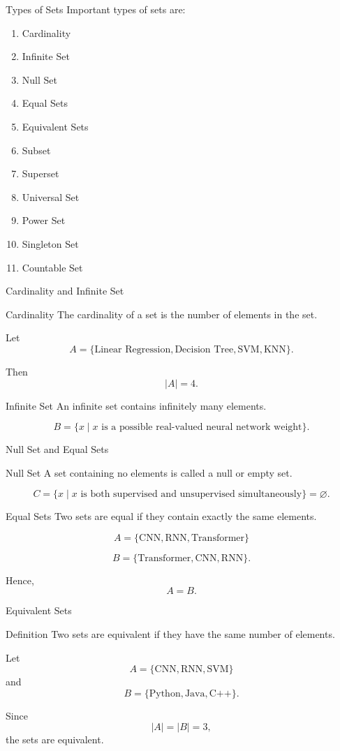 \documentclass[aspectratio=169]{beamer}
\begin{document}
\begin{frame}{Types of Sets}
Important types of sets are:

\begin{enumerate}
\item Cardinality
\item Infinite Set
\item Null Set
\item Equal Sets
\item Equivalent Sets
\item Subset
\item Superset
\item Universal Set
\item Power Set
\item Singleton Set
\item Countable Set
\end{enumerate}
\end{frame}

\begin{frame}{Cardinality and Infinite Set}
\begin{block}{Cardinality}
The cardinality of a set is the number of elements in the set.
\end{block}

Let
\[
A=\{\text{Linear Regression},\text{Decision Tree},\text{SVM},\text{KNN}\}.
\]

Then
\[
|A|=4.
\]

\begin{block}{Infinite Set}
An infinite set contains infinitely many elements.
\end{block}

\[
B=\{x\mid x\text{ is a possible real-valued neural network weight}\}.
\]
\end{frame}

\begin{frame}{Null Set and Equal Sets}
\begin{block}{Null Set}
A set containing no elements is called a null or empty set.
\end{block}

\[
C=\{x\mid x\text{ is both supervised and unsupervised simultaneously}\}
=\varnothing.
\]

\begin{block}{Equal Sets}
Two sets are equal if they contain exactly the same elements.
\end{block}

\[
A=\{\text{CNN},\text{RNN},\text{Transformer}\}
\]

\[
B=\{\text{Transformer},\text{CNN},\text{RNN}\}.
\]

Hence,
\[
A=B.
\]
\end{frame}
\begin{frame}{Equivalent Sets}
\begin{block}{Definition}
Two sets are equivalent if they have the same number of elements.
\end{block}

Let
\[
A=\{\text{CNN},\text{RNN},\text{SVM}\}
\]
and
\[
B=\{\text{Python},\text{Java},\text{C++}\}.
\]

Since
\[
|A|=|B|=3,
\]
the sets are equivalent.
\end{frame}
\end{document}
